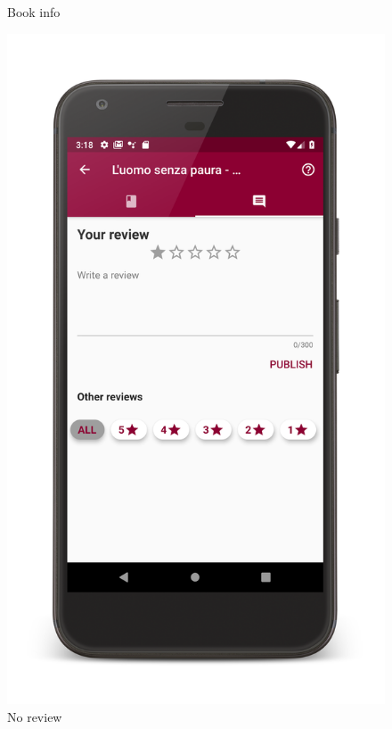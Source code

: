 \begin{figure}[!htb]
\begin{minipage}[b]{0.3\textwidth}
        \caption{Book info}
        \label{ref:bookinfo}
    \end{minipage}
    \hfill
    \begin{minipage}[b]{0.3\textwidth}
        \centering
        \includegraphics[scale=0.09]{images/no-review.png}
        \caption{No review}
        \label{ref:noreview}
    \end{minipage}
    \hfill
    \begin{minipage}[b]{0.3\textwidth}
        \centering

\end{minipage}
\end{figure}
